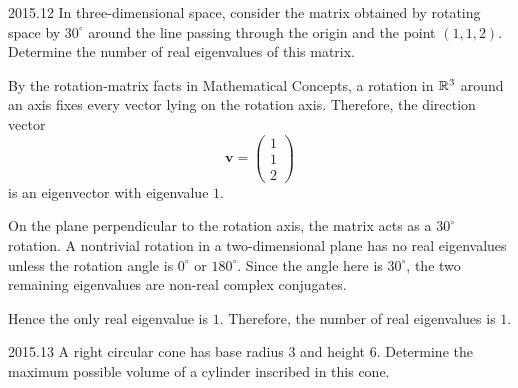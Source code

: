     \begin{pastproblem}{2015.12}
        In three-dimensional space, consider the matrix obtained by rotating space by $30^\circ$
        around the line passing through the origin and the point $(1,1,2)$. Determine the number of
        real eigenvalues of this matrix.
    \end{pastproblem}

    \begin{solution}
        By the rotation-matrix facts in Mathematical Concepts, a rotation in
        $\mathbb{R}^3$ around an axis fixes every vector lying on the rotation axis.
        Therefore, the direction vector
        \[
            \mathbf{v}
            =
            \begin{pmatrix}
                1 \\
                1 \\
                2
            \end{pmatrix}
        \]
        is an eigenvector with eigenvalue $1$.

        On the plane perpendicular to the rotation axis, the matrix acts as a $30^\circ$ rotation. A
        nontrivial rotation in a two-dimensional plane has no real eigenvalues unless the rotation
        angle is $0^\circ$ or $180^\circ$. Since the angle here is $30^\circ$, the two remaining
        eigenvalues are non-real complex conjugates.

        Hence the only real eigenvalue is $1$. Therefore, the number of real eigenvalues is
        $\boxed{1}$.
    \end{solution}

    \begin{pastproblem}{2015.13}
        A right circular cone has base radius $3$ and height $6$. Determine the maximum possible
        volume of a cylinder inscribed in this cone.
    \end{pastproblem}


